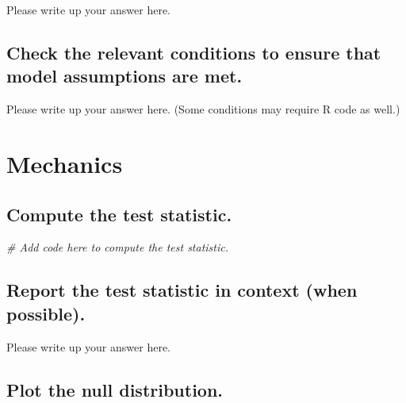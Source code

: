 \documentclass[
]{book}
\newenvironment{Shaded}{\begin{snugshade}}{\end{snugshade}}
\newcommand{\CommentTok}[1]{\textcolor[rgb]{0.56,0.35,0.01}{\textit{#1}}}
\begin{document}
Please write up your answer here.

\hypertarget{check-the-relevant-conditions-to-ensure-that-model-assumptions-are-met.-5}{%
\subsection*{Check the relevant conditions to ensure that model assumptions are met.}\label{check-the-relevant-conditions-to-ensure-that-model-assumptions-are-met.-5}}

Please write up your answer here. (Some conditions may require R code as well.)

\hypertarget{mechanics-3}{%
\section*{Mechanics}\label{mechanics-3}}

\hypertarget{compute-the-test-statistic.-3}{%
\subsection*{Compute the test statistic.}\label{compute-the-test-statistic.-3}}

\begin{Shaded}
\begin{Highlighting}[]
\CommentTok{\# Add code here to compute the test statistic.}
\end{Highlighting}
\end{Shaded}

\hypertarget{report-the-test-statistic-in-context-when-possible.-3}{%
\subsection*{Report the test statistic in context (when possible).}\label{report-the-test-statistic-in-context-when-possible.-3}}

Please write up your answer here.

\hypertarget{plot-the-null-distribution.-3}{%
\subsection*{Plot the null distribution.}\label{plot-the-null-distribution.-3}}
\end{document}
